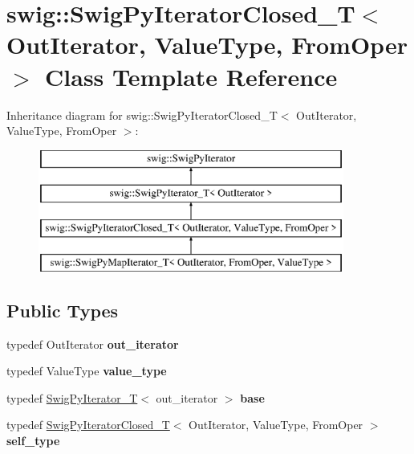 \hypertarget{classswig_1_1SwigPyIteratorClosed__T}{}\section{swig\+:\+:Swig\+Py\+Iterator\+Closed\+\_\+T$<$ Out\+Iterator, Value\+Type, From\+Oper $>$ Class Template Reference}
\label{classswig_1_1SwigPyIteratorClosed__T}
Inheritance diagram for swig\+:\+:Swig\+Py\+Iterator\+Closed\+\_\+T$<$ Out\+Iterator, Value\+Type, From\+Oper $>$\+:\begin{figure}[H]
\begin{center}
\leavevmode
\includegraphics[height=4.000000cm]{classswig_1_1SwigPyIteratorClosed__T}
\end{center}
\end{figure}
\subsection*{Public Types}
\begin{DoxyCompactItemize}
\item 
\mbox{\label{classswig_1_1SwigPyIteratorClosed__T_ad1905c1ed0b2c2cb975788b82df5dba7}} 
typedef Out\+Iterator {\bfseries out\+\_\+iterator}
\item 
\mbox{\label{classswig_1_1SwigPyIteratorClosed__T_adff468d976862d52fa259857d5a30dba}} 
typedef Value\+Type {\bfseries value\+\_\+type}
\item 
\mbox{\label{classswig_1_1SwigPyIteratorClosed__T_a7a4e72c91ddb0aa9a92484d20c260ee8}} 
typedef \mbox{\hyperlink{classswig_1_1SwigPyIterator__T}{Swig\+Py\+Iterator\+\_\+T}}$<$ out\+\_\+iterator $>$ {\bfseries base}
\item 
\mbox{\label{classswig_1_1SwigPyIteratorClosed__T_a37a58d5b5c7a26f9345246d781e7edd4}} 
typedef \mbox{\hyperlink{classswig_1_1SwigPyIteratorClosed__T}{Swig\+Py\+Iterator\+Closed\+\_\+T}}$<$ Out\+Iterator, Value\+Type, From\+Oper $>$ {\bfseries self\+\_\+type}
\end{DoxyCompactItemize}
